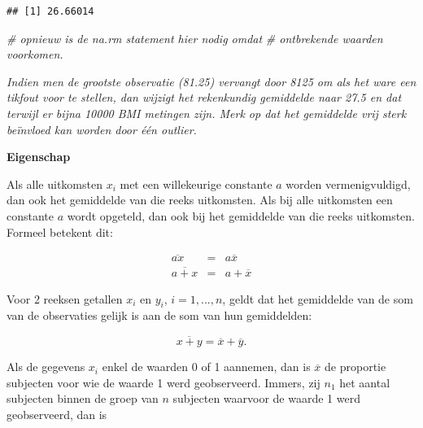 \documentclass[
  12pt,dutch]{book}
\newenvironment{Shaded}{\begin{snugshade}}{\end{snugshade}}
\newcommand{\AttributeTok}[1]{\textcolor[rgb]{0.13,0.29,0.53}{#1}}
\newcommand{\CommentTok}[1]{\textcolor[rgb]{0.56,0.35,0.01}{\textit{#1}}}
\newcommand{\ConstantTok}[1]{\textcolor[rgb]{0.56,0.35,0.01}{#1}}
\newcommand{\FunctionTok}[1]{\textcolor[rgb]{0.13,0.29,0.53}{\textbf{#1}}}
\newcommand{\NormalTok}[1]{#1}
\newcommand{\SpecialCharTok}[1]{\textcolor[rgb]{0.81,0.36,0.00}{\textbf{#1}}}
\theoremstyle{definition}
\theoremstyle{definition}
\theoremstyle{definition}
\theoremstyle{definition}
\theoremstyle{remark}
\begin{document}
\begin{Shaded}
\end{Shaded}

\begin{verbatim}
## [1] 26.66014
\end{verbatim}

\begin{Shaded}
\begin{Highlighting}[]
\CommentTok{\# opnieuw is de na.rm statement hier nodig omdat}
\CommentTok{\# ontbrekende waarden voorkomen.}
\end{Highlighting}
\end{Shaded}

\emph{Indien men de grootste observatie (81.25) vervangt door 8125 om als het ware een tikfout voor te stellen, dan wijzigt het rekenkundig gemiddelde naar 27.5 en dat terwijl er bijna 10000 BMI metingen zijn. Merk op dat het gemiddelde vrij sterk beïnvloed kan worden door één outlier.}

\textbf{Eigenschap}

Als alle uitkomsten \(x_i\) met een willekeurige constante \(a\)
worden vermenigvuldigd, dan ook het gemiddelde van die reeks uitkomsten. Als
bij alle uitkomsten een constante \(a\) wordt opgeteld, dan ook bij het
gemiddelde van die reeks uitkomsten. Formeel betekent dit:

\begin{eqnarray*}
\overline{ax} &= &a \overline{x} \\
\overline{a + x} &= &a + \overline{x}
\end{eqnarray*}

Voor 2 reeksen getallen \(x_i\) en \(y_i\), \(i=1,...,n\), geldt dat het
gemiddelde van de som van de observaties gelijk is aan de som van hun
gemiddelden:

\begin{equation*}
\overline{x + y} = \overline{x} + \overline{y}.
\end{equation*}

Als de gegevens \(x_i\) enkel de waarden 0 of 1 aannemen, dan is \(\overline{x}\)
de proportie subjecten voor wie de waarde 1 werd geobserveerd. Immers, zij \(n_1\) het aantal subjecten binnen de groep van \(n\) subjecten waarvoor de
waarde 1 werd geobserveerd, dan is
\end{document}
